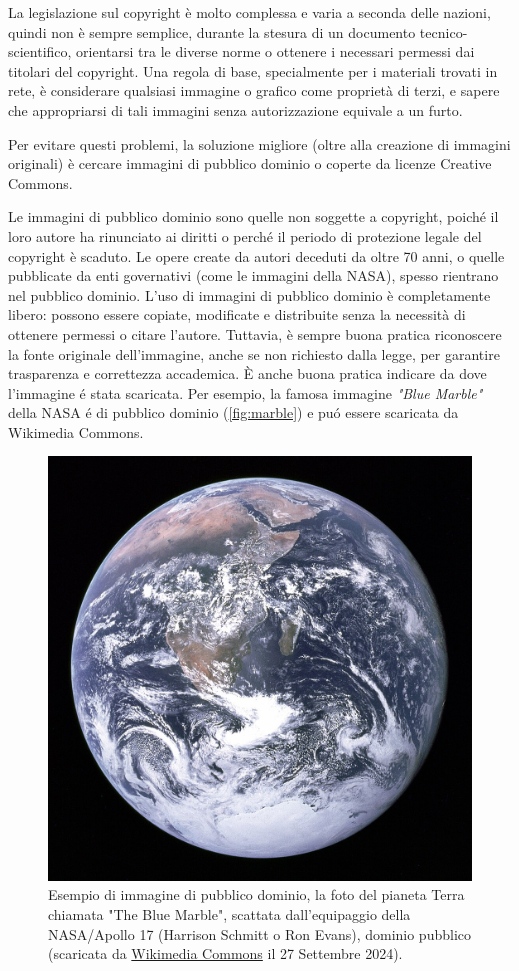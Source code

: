 \documentclass[9pt,a4paper,twoside]{rho-class/rho}
\begin{document}
La legislazione sul copyright è molto complessa e varia a seconda delle nazioni, quindi non è sempre semplice, durante la stesura di un documento tecnico-scientifico, orientarsi tra le diverse norme o ottenere i necessari permessi dai titolari del copyright. Una regola di base, specialmente per i materiali trovati in rete, è considerare qualsiasi immagine o grafico come proprietà di terzi, e sapere che appropriarsi di tali immagini senza autorizzazione equivale a un furto.

Per evitare questi problemi, la soluzione migliore (oltre alla creazione di immagini originali) è cercare immagini di pubblico dominio o coperte da licenze Creative Commons.

Le immagini di pubblico dominio sono quelle non soggette a copyright, poiché il loro autore ha rinunciato ai diritti o perché il periodo di protezione legale del copyright è scaduto. Le opere create da autori deceduti da oltre 70 anni, o quelle pubblicate da enti governativi (come le immagini della NASA), spesso rientrano nel pubblico dominio. L’uso di immagini di pubblico dominio è completamente libero: possono essere copiate, modificate e distribuite senza la necessità di ottenere permessi o citare l’autore. Tuttavia, è sempre buona pratica riconoscere la fonte originale dell’immagine, anche se non richiesto dalla legge, per garantire trasparenza e correttezza accademica. È anche buona pratica indicare da dove l'immagine é stata scaricata. Per esempio, la famosa immagine \textit{"Blue Marble"} della NASA é di pubblico dominio (\autoref{fig:marble}) e puó essere scaricata da Wikimedia Commons.

\begin{figure}[h!]
    \centering
    \includegraphics[width=0.8\linewidth]{figures/BlueMarble.jpg}
    \caption{Esempio di immagine di pubblico dominio, la foto del pianeta Terra chiamata "The Blue Marble", scattata dall'equipaggio della NASA/Apollo 17 (Harrison Schmitt o Ron Evans), dominio pubblico (scaricata da \href{(https://en.wikipedia.org/wiki/File:The_Earth_seen_from_Apollo_17.jpg}{Wikimedia Commons} il 27 Settembre 2024).}
    \label{fig:marble}
\end{figure}
\end{document}
